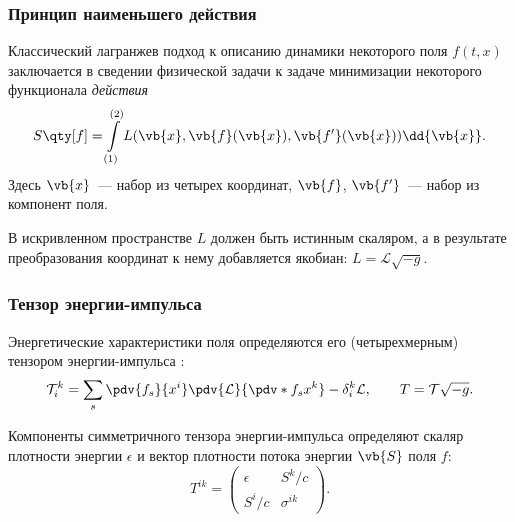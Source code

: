 \documentclass[compress, 9pt]{beamer}
\begin{document}
    \begin{frame}\frametitle{Принцип наименьшего действия}

        Классический лагранжев подход к описанию динамики некоторого поля $f(t,x)$ заключается в сведении физической задачи к задаче минимизации некоторого функционала \textit{действия} \cite{landau_v1}
        \begin{equation*}
            S\qty[f] = \int\limits_{(1)}^{(2)} L(\vb{x}, \vb{f}(\vb{x}), \vb{f'}(\vb{x})) \dd{\vb{x}}.
        \end{equation*}
        Здесь $\vb{x}$~--- набор из четырех координат, $\vb{f}$, $\vb{f'}$~--- набор из компонент поля.

        В искривленном пространстве $L$ должен быть истинным скаляром, а в результате преобразования координат к нему добавляется якобиан: $L = \mathcal{L} \sqrt{-g}$.

    \end{frame}

    \begin{frame}\frametitle{Тензор энергии-импульса}

        Энергетические характеристики поля определяются его (четырехмерным) тензором энергии-импульса \cite{landau_v1,landau_v2}:
        \begin{equation*}
            \mathcal{T}_i^k = \sum_s \pdv{f_s}{x^i} \pdv{\mathcal{L}}{\pdv*{f_s}{x^k}} - \delta_i^k \mathcal{L} ,
            \qquad T = \mathcal{T} \sqrt{-g} .
        \end{equation*}

        Компоненты симметричного тензора энергии-импульса определяют скаляр плотности энергии $\epsilon$ и вектор плотности потока энергии $\vb{S}$ поля $f$:
        \begin{equation*}
            T^{ik} = \begin{pmatrix}
                \epsilon & S^k / c \\
                S^i / c  & \sigma^{ik}
            \end{pmatrix} .
        \end{equation*}

    \end{frame}
\end{document}
